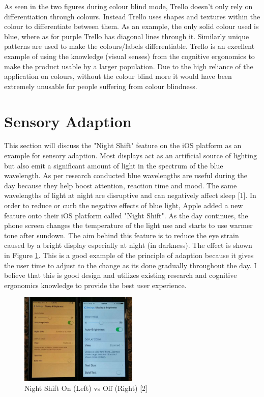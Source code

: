 \documentclass[12pt]{article}
\begin{document}
	As seen in the two figures during colour blind mode, Trello doesn't only rely on differentiation through colours. Instead Trello uses shapes and textures within the colour to differentiate between them. As an example, the only solid colour used is blue, where as for purple Trello has diagonal lines through it. Similarly unique patterns are used to make the colours/labels differentiable. Trello is an excellent example of using the knowledge (visual senses) from the cognitive ergonomics to make the product usable by a larger population. Due to the high reliance of the application on colours, without the colour blind more it would have been extremely unusable for people suffering from colour blindness.
	
	\section{Sensory Adaption}
	This section will discuss the "Night Shift" feature on the iOS platform as an example for sensory adaption. Most displays act as an artificial source of lighting but also emit a significant amount of light in the spectrum of the blue wavelength. As per research conducted blue wavelengths are useful during the day because they help boost attention, reaction time and mood. The same wavelengths of light at night are disruptive and can negatively affect sleep [1]. In order to reduce or curb the negative effects of blue light, Apple added a new feature onto their iOS platform called "Night Shift". As the day continues, the phone screen changes the temperature of the light use and starts to use warmer tone after sundown. The aim behind this feature is to reduce the eye strain caused by a bright display especially at night (in darkness). The effect is shown in Figure \ref{nightshift}. This is a good example of the principle of adaption because it gives the user time to adjust to the change as its done gradually throughout the day. I believe that this is good design and utilizes existing research and cognitive ergonomics knowledge to provide the best user experience.
	
	\begin{figure}[!ht]
		\centering
		\includegraphics[width=0.5\textwidth]{nightshift}
		\caption{Night Shift On (Left) vs Off (Right) [2]}
		\label{nightshift}
	\end{figure}
	
\end{document}
